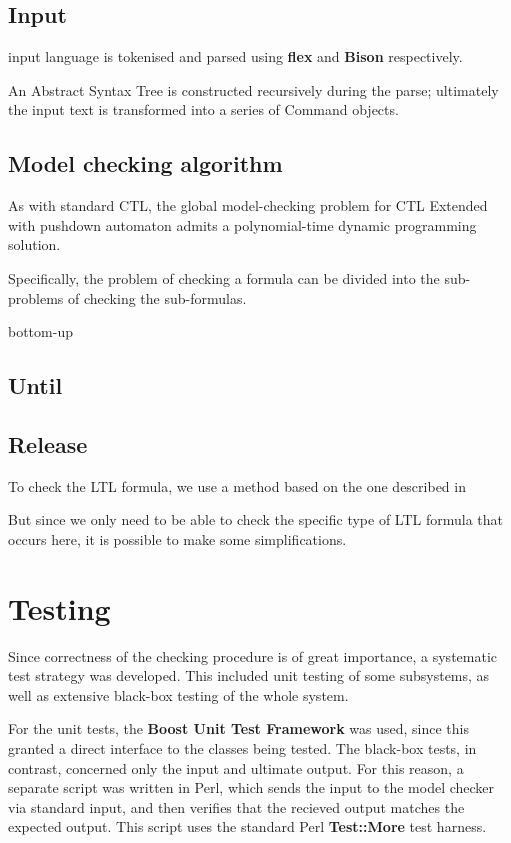 \documentclass[11pt]{article}
\theoremstyle{definition}
\begin{document}

\subsection{Input}
input language is tokenised and parsed using \textbf{flex} and \textbf{Bison} respectively. 

An Abstract Syntax Tree is constructed recursively during the parse; ultimately
the input text is transformed into a series of Command objects. 




\subsection{Model checking algorithm}

As with standard CTL, the global model-checking problem for CTL Extended with
pushdown automaton admits a polynomial-time dynamic programming solution.

Specifically, the problem of checking a formula can be divided into the
sub-problems of checking the sub-formulas. %

bottom-up

\subsection{Until}

\subsection{Release}
To check the LTL formula, we use a method based on the one described in \cite{EHRS00b} %

But since we only need to be able to check the specific type of LTL formula
that occurs here, it is possible to make some simplifications.

\section{Testing}

Since correctness of the checking procedure is of great importance, a
systematic test strategy was developed. This included unit testing of some
subsystems, as well as extensive black-box testing of the whole system.

For the unit tests, the \textbf{Boost Unit Test Framework} was used, since this
granted a direct interface to the classes being tested. The black-box tests, in
contrast, concerned only the input and ultimate output. For this reason, a
separate script was written in Perl, which sends the input to the model checker
via standard input, and then verifies that the recieved output matches the
expected output. This script uses the standard Perl \textbf{Test::More} test
harness.
\end{document}
